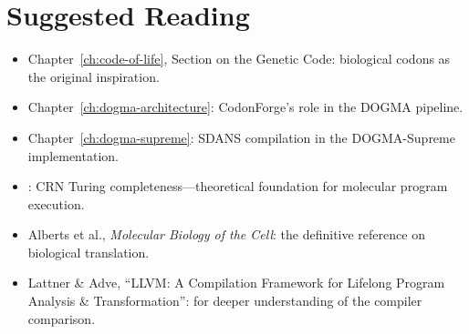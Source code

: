 \section*{Suggested Reading}
\begin{itemize}[leftmargin=1.5em]
  \item Chapter~\ref{ch:code-of-life}, Section on the Genetic Code: biological codons as the original inspiration.
  \item Chapter~\ref{ch:dogma-architecture}: CodonForge's role in the DOGMA pipeline.
  \item Chapter~\ref{ch:dogma-supreme}: SDANS compilation in the DOGMA-Supreme implementation.
  \item \citet{soloveichik2010}: CRN Turing completeness---theoretical foundation for molecular program execution.
  \item Alberts et al., \emph{Molecular Biology of the Cell}: the definitive reference on biological translation.
  \item Lattner \& Adve, ``LLVM: A Compilation Framework for Lifelong Program Analysis \& Transformation'': for deeper understanding of the compiler comparison.
\end{itemize}
